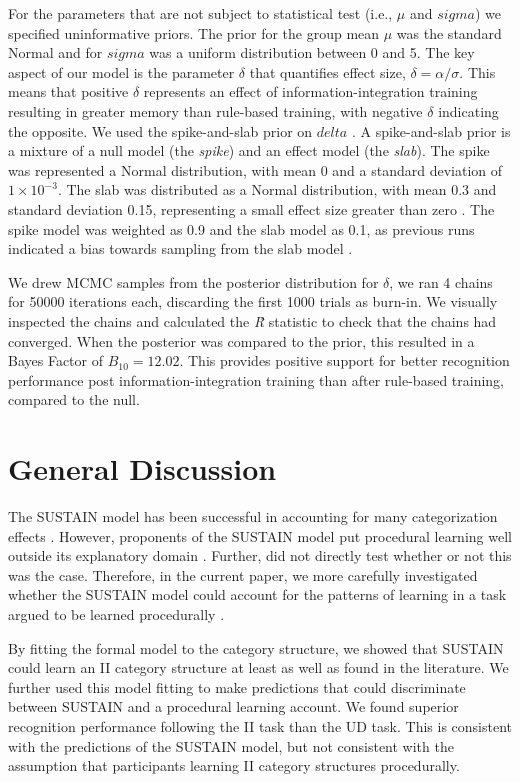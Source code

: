 \documentclass[12pt]{article}
\begin{document}
For the parameters that are not subject to statistical test (i.e., $\mu$ and $sigma$) we specified uninformative priors. The prior for the group mean $\mu$ was the standard Normal and for $sigma$ was a uniform distribution between 0 and 5. The key aspect of our model is the parameter $\delta$ that quantifies effect size, $\delta=\alpha/\sigma$. This means that positive $\delta$ represents an effect of information-integration training resulting in greater memory than rule-based training, with negative $\delta$ indicating the opposite. We used the spike-and-slab prior on $delta$ \cite{Rouder:2018cz}. A spike-and-slab prior is a mixture of a null model (the \emph{spike}) and an effect model (the \emph{slab}).  The spike was represented a Normal distribution, with mean 0 and a standard deviation of $1 \times 10^{-3}$. The slab was distributed as a Normal distribution, with mean 0.3 and standard deviation 0.15, representing a small effect size greater than zero \cite{Dienes2011}. The spike model was weighted as 0.9 and the slab model as 0.1, as previous runs indicated a bias towards sampling from the slab model \cite{Kruschke2015}.

We drew MCMC samples from the posterior distribution for $\delta$, we ran 4 chains for 50000 iterations each, discarding the first 1000 trials as burn-in. We visually inspected the chains and calculated the  {\it \^{R}} statistic to check that the chains had converged. When the posterior was compared to the prior, this resulted in a Bayes Factor of $B_{10}=12.02$. This provides positive support for better recognition performance post information-integration training than after rule-based training, compared to the null. 

\section{General Discussion}
The SUSTAIN model has been successful in accounting for many categorization effects \cite{Love2004}. 
However, proponents of the SUSTAIN model put procedural learning well outside its explanatory domain \cite{Davis2012a}. 
Further,  did not directly test whether or not this was the case. 
Therefore, in the current paper, we more carefully investigated whether the SUSTAIN model could account for the patterns of learning in a task argued to be learned procedurally \cite{Ashby:2017fm}. 

By fitting the formal model to the category structure, we showed that SUSTAIN could learn an II category structure at least as well as found in the literature. 
We further used this model fitting to make predictions that could discriminate between SUSTAIN and a procedural learning account. 
We found superior recognition performance following the II task than the UD task. 
This is consistent with the predictions of the SUSTAIN model, but not consistent with the assumption that participants learning II category structures procedurally. 
\end{document}
